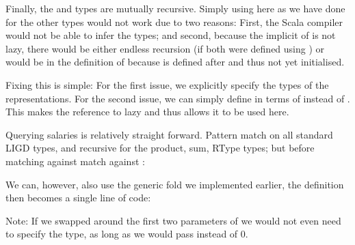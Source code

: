 Finally, the  and  types are mutually recursive. Simply
using  here as we have done for the other types would not work due
to two reasons: First, the Scala compiler would not be able to infer the types;
and second, because the implicit  of  is not lazy, there would
be either endless recursion (if both were defined using ) or 
would be  in the definition of  because  is defined
after  and thus not yet initialised.

Fixing this is simple: For the first issue, we explicitly specify the types of
the representations. For the second issue, we can simply define  in
terms of  instead of . This makes the reference to 
lazy and thus allows it to be used here.



\begin{example}

Querying salaries is relatively straight forward. Pattern match on all standard
LIGD types, and recursive for the product, sum, RType types; but before matching
against  match against :



We can, however, also use the generic fold we implemented earlier, the definition
then becomes a single line of code:



Note: If we swapped around the first two parameters of  we would not even
need to specify the  type, as long as we would pass  instead
of 0.

\end{example}

